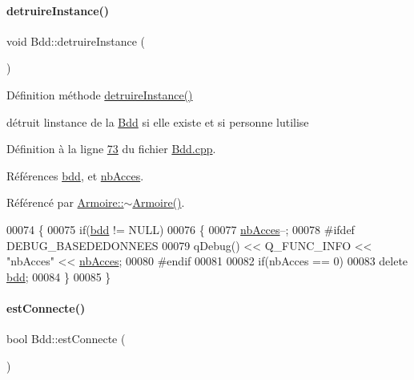 \paragraph{\texorpdfstring{detruire\+Instance()}{detruireInstance()}}
{\footnotesize\ttfamily void Bdd\+::detruire\+Instance (\begin{DoxyParamCaption}{ }\end{DoxyParamCaption})\hspace{0.3cm}{\ttfamily [static]}}



Définition méthode \hyperlink{class_bdd_af89fa3ffa107c7859a3964bf032cfdb7}{detruire\+Instance()} 

détruit l\textquotesingle{}instance de la \hyperlink{class_bdd}{Bdd} si elle existe et si personne l\textquotesingle{}utilise 

Définition à la ligne \hyperlink{_bdd_8cpp_source_l00073}{73} du fichier \hyperlink{_bdd_8cpp_source}{Bdd.\+cpp}.



Références \hyperlink{_bdd_8h_source_l00064}{bdd}, et \hyperlink{_bdd_8h_source_l00065}{nb\+Acces}.



Référencé par \hyperlink{_armoire_8cpp_source_l00036}{Armoire\+::$\sim$\+Armoire()}.


\begin{DoxyCode}
00074 \{
00075     \textcolor{keywordflow}{if}(\hyperlink{class_bdd_a09bd3b3a31feedf3dd42a507e0249213}{bdd} != NULL)
00076     \{
00077         \hyperlink{class_bdd_a9fb6aa118a28c27307f27fd7662e462d}{nbAcces}--;
00078 \textcolor{preprocessor}{        #ifdef DEBUG\_BASEDEDONNEES}
00079         qDebug() << Q\_FUNC\_INFO << \textcolor{stringliteral}{"nbAcces"} << \hyperlink{class_bdd_a9fb6aa118a28c27307f27fd7662e462d}{nbAcces};
00080 \textcolor{preprocessor}{        #endif}
00081 
00082         \textcolor{keywordflow}{if}(nbAcces == 0)
00083             \textcolor{keyword}{delete} \hyperlink{class_bdd_a09bd3b3a31feedf3dd42a507e0249213}{bdd};
00084     \}
00085 \}
\end{DoxyCode}
\mbox{\label{class_bdd_afeb7ee6793705cb94a94560fd53e3e9d}} 
\paragraph{\texorpdfstring{est\+Connecte()}{estConnecte()}}
{\footnotesize\ttfamily bool Bdd\+::est\+Connecte (\begin{DoxyParamCaption}{ }\end{DoxyParamCaption})}



